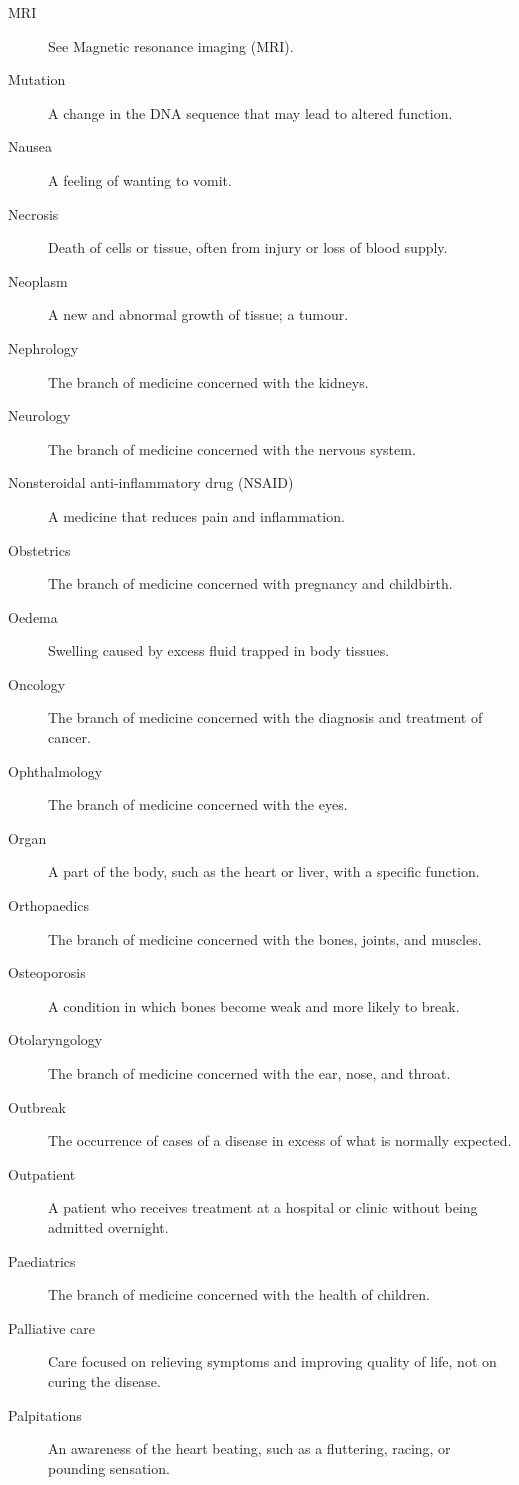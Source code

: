 \documentclass[12pt,oneside]{book}
\begin{document}
\begin{description}
  \item[MRI] See Magnetic resonance imaging (MRI).
  \item[Mutation] A change in the DNA sequence that may lead to altered function.
  \item[Nausea] A feeling of wanting to vomit.
  \item[Necrosis] Death of cells or tissue, often from injury or loss of blood supply.
  \item[Neoplasm] A new and abnormal growth of tissue; a tumour.
  \item[Nephrology] The branch of medicine concerned with the kidneys.
  \item[Neurology] The branch of medicine concerned with the nervous system.
  \item[Nonsteroidal anti-inflammatory drug (NSAID)] A medicine that reduces pain and inflammation.
  \item[Obstetrics] The branch of medicine concerned with pregnancy and childbirth.
  \item[Oedema] Swelling caused by excess fluid trapped in body tissues.
  \item[Oncology] The branch of medicine concerned with the diagnosis and treatment of cancer.
  \item[Ophthalmology] The branch of medicine concerned with the eyes.
  \item[Organ] A part of the body, such as the heart or liver, with a specific function.
  \item[Orthopaedics] The branch of medicine concerned with the bones, joints, and muscles.
  \item[Osteoporosis] A condition in which bones become weak and more likely to break.
  \item[Otolaryngology] The branch of medicine concerned with the ear, nose, and throat.
  \item[Outbreak] The occurrence of cases of a disease in excess of what is normally expected.
  \item[Outpatient] A patient who receives treatment at a hospital or clinic without being admitted overnight.
  \item[Paediatrics] The branch of medicine concerned with the health of children.
  \item[Palliative care] Care focused on relieving symptoms and improving quality of life, not on curing the disease.
  \item[Palpitations] An awareness of the heart beating, such as a fluttering, racing, or pounding sensation.

\end{description}
\end{document}
